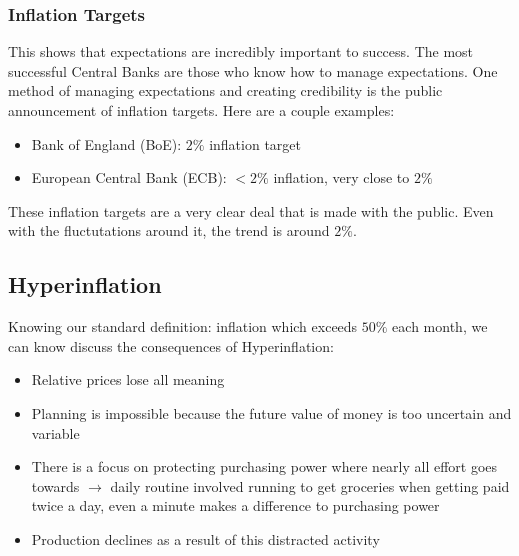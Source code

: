 \documentclass[12pt, letterpaper]{article}
\begin{document}
\subsubsection{Inflation Targets}
This shows that expectations are incredibly important to success. The most successful Central Banks are those who know how to manage expectations. One method of managing expectations and creating credibility is the public announcement of inflation targets. Here are a couple examples:
\begin{itemize}
	\item Bank of England (BoE): $2\%$ inflation target
	\item European Central Bank (ECB): $<2\%$ inflation, very close to $2\%$
\end{itemize}
These inflation targets are a very clear deal that is made with the public. Even with the fluctutations around it, the trend is around $2\%$.

\subsection{Hyperinflation}
Knowing our standard definition: inflation which exceeds $50\%$ each month, we can know discuss the consequences of Hyperinflation:
\begin{itemize}
	\item Relative prices lose all meaning
	\item Planning is impossible because the future value of money is too uncertain and variable
	\item There is a focus on protecting purchasing power where nearly all effort goes towards $\rightarrow$ daily routine involved running to get groceries when getting paid twice a day, even a minute makes a difference to purchasing power
	\item Production declines as a result of this distracted activity
\end{itemize}
\end{document}
